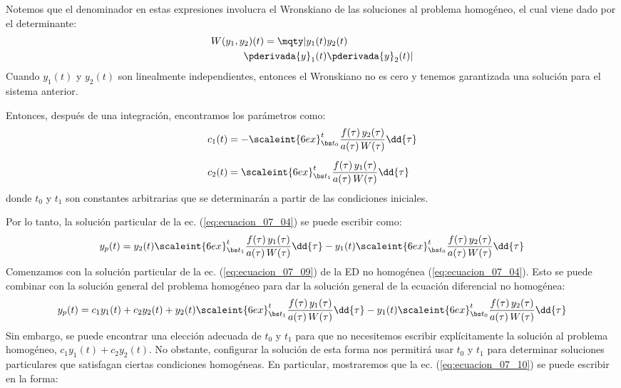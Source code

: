 Notemos que el denominador en estas expresiones involucra el Wronskiano de las soluciones al problema homogéneo, el cual viene dado por el determinante:
\begin{align*}
W (y_{1}, y_{2}) (t) = \mqty|
y_{1} (t) & y_{2} (t) \\
\pderivada{y}_{1} (t) & \pderivada{y}_{2} (t) |
\end{align*}
Cuando $y_{1} (t)$ y $y_{2} (t)$ son linealmente independientes, entonces el Wronskiano no es cero y tenemos garantizada una solución para el sistema anterior.
\par
Entonces, después de una integración, encontramos los parámetros como:
\begin{align}
\begin{aligned}
c_{1} (t) &= - \scaleint{6ex}_{\bs t_{0}}^{t} \dfrac{f (\tau) \, y_{2} (\tau)}{a (\tau) \, W (\tau)} \dd{\tau} \\[0.5em]
c_{2} (t) &= \scaleint{6ex}_{\bs t_{1}}^{t} \dfrac{f (\tau) \, y_{1} (\tau)}{a (\tau) \, W (\tau)} \dd{\tau}
\end{aligned}
\label{eq:ecuacion_07_08}
\end{align}
donde $t_{0}$ y $t_{1}$ son constantes arbitrarias que se determinarán a partir de las condiciones iniciales.
\par
Por lo tanto, la solución particular de la ec. (\ref{eq:ecuacion_07_04}) se puede escribir como:
\begin{align}
y_{p} (t) = y_{2} (t) \scaleint{6ex}_{\bs t_{1}}^{t} \dfrac{f (\tau) \, y_{1} (\tau)}{a (\tau) \, W (\tau)} \dd{\tau} - y_{1} (t) \scaleint{6ex}_{\bs t_{0}}^{t} \dfrac{f (\tau) \, y_{2} (\tau)}{a (\tau) \, W (\tau)} \dd{\tau}
\label{eq:ecuacion_07_09}
\end{align}
Comenzamos con la solución particular de la ec. (\ref{eq:ecuacion_07_09}) de la ED no homogénea (\ref{eq:ecuacion_07_04}). Esto se puede combinar con la solución general del problema homogéneo para dar la solución general de la ecuación diferencial no homogénea:
\begin{align}
y_{p} (t) = c_{1} y_{1} (t) + c_{2} y_{2} (t) +  y_{2} (t) \scaleint{6ex}_{\bs t_{1}}^{t} \dfrac{f (\tau) \, y_{1} (\tau)}{a (\tau) \, W (\tau)} \dd{\tau} - y_{1} (t) \scaleint{6ex}_{\bs t_{0}}^{t} \dfrac{f (\tau) \, y_{2} (\tau)}{a (\tau) \, W (\tau)} \dd{\tau}
\label{eq:ecuacion_07_10}
\end{align}
Sin embargo, se puede encontrar una elección adecuada de $t_{0}$ y $t_{1}$ para que no necesitemos escribir explícitamente la solución al problema homogéneo, $c_{1} y_{1} (t) + c_{2} y_{2} (t)$. No obstante, configurar la solución de esta forma nos permitirá usar $t_{0}$ y $t_{1}$ para determinar soluciones particulares que satisfagan ciertas condiciones homogéneas. En particular, mostraremos que la ec. (\ref{eq:ecuacion_07_10}) se puede escribir en la forma:

